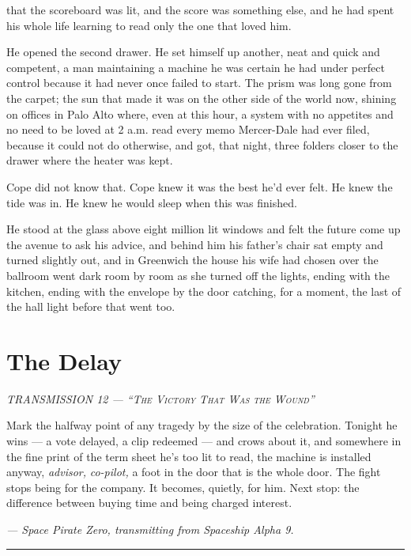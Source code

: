 \documentclass[11pt,openany]{book}
\newcommand{\transheader}{\normalfont\footnotesize\scshape\letterspace}
\newcommand{\letterspace}{}
\newenvironment{transmission}{%
  \par\vspace{0.3\baselineskip}\begin{center}\begin{minipage}{0.88\textwidth}%
  \itshape\small\setlength{\parindent}{0pt}\setstretch{1.06}}%
  {\end{minipage}\end{center}\vspace{0.4\baselineskip}%
  \noindent\hfil\rule{0.35\textwidth}{0.3pt}\hfil\par\vspace{1.0\baselineskip}}
\begin{document}
that the scoreboard was lit, and the score was something else, and he had spent his whole life learning to read only the one that loved him.

He opened the second drawer. He set himself up another, neat and quick and competent, a man maintaining a machine he was certain he had under perfect control because it had never once failed to start. The prism was long gone from the carpet; the sun that made it was on the other side of the world now, shining on offices in Palo Alto where, even at this hour, a system with no appetites and no need to be loved at 2 a.m. read every memo Mercer-Dale had ever filed, because it could not do otherwise, and got, that night, three folders closer to the drawer where the heater was kept.

Cope did not know that. Cope knew it was the best he'd ever felt. He knew the tide was in. He knew he would sleep when this was finished.

He stood at the glass above eight million lit windows and felt the future come up the avenue to ask his advice, and behind him his father's chair sat empty and turned slightly out, and in Greenwich the house his wife had chosen over the ballroom went dark room by room as she turned off the lights, ending with the kitchen, ending with the envelope by the door catching, for a moment, the last of the hall light before that went too.

\clearpage
\chapter{The Delay}

\begin{transmission}
{\transheader TRANSMISSION 12 --- ``The Victory That Was the Wound''}\par\vspace{0.5em}
Mark the halfway point of any tragedy by the size of the celebration. Tonight he wins --- a vote delayed, a clip redeemed --- and crows about it, and somewhere in the fine print of the term sheet he's too lit to read, the machine is installed anyway, \textit{advisor,} \textit{co-pilot,} a foot in the door that is the whole door. The fight stops being for the company. It becomes, quietly, for him. Next stop: the difference between buying time and being charged interest.\par
\vspace{0.5em}\hfill\textit{--- Space Pirate Zero, transmitting from Spaceship Alpha 9.}\par
\end{transmission}
\end{document}
